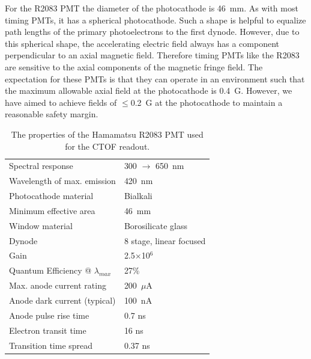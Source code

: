 \documentclass{elsart}
\begin{document}
For the R2083 PMT the diameter of the photocathode is 46~mm. As with most timing PMTs, it
has a spherical photocathode. Such a shape is helpful to equalize path lengths of the primary 
photoelectrons to the first dynode. However, due to this spherical shape, the accelerating electric
field always has a component perpendicular to an axial magnetic field. Therefore timing PMTs like
the R2083 are sensitive to the axial components of the magnetic fringe field. The expectation for
these PMTs is that they can operate in an environment such that the maximum allowable axial field
at the photocathode is 0.4~G. However, we have aimed to achieve fields of $\le$0.2~G at the 
photocathode to maintain a reasonable safety margin.

\begin{table}[htbp]
\begin{center}
\begin{tabular}{ll} \hline
Spectral response           & 300 $\to$ 650~nm \\
Wavelength of max. emission & 420~nm \\
Photocathode material       & Bialkali \\
Minimum effective area      & 46~mm \\
Window material             & Borosilicate glass \\
Dynode                      & 8 stage, linear focused \\
Gain                        & 2.5$\times$10$^6$ \\
Quantum Efficiency @ $\lambda_{max}$ & 27\% \\
Max. anode current rating   & 200~$\mu$A \\
Anode dark current (typical) & 100~nA \\
Anode pulse rise time       & 0.7 ns \\
Electron transit time       & 16 ns \\
Transition time spread      & 0.37 ns \\ \hline
\end{tabular}
\end{center}
\caption{The properties of the Hamamatsu R2083 PMT used for the CTOF readout.}
\label{pmt-specs}
\end{table}
\end{document}
